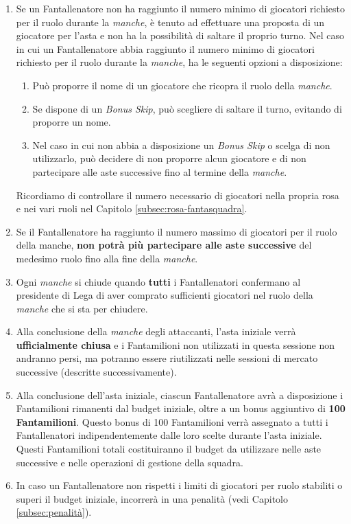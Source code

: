 \documentclass[12pt]{article}
\begin{document}
\begin{enumerate}
\item Se un Fantallenatore non ha raggiunto il numero minimo di giocatori richiesto per il ruolo durante la \textit{manche}, è tenuto ad effettuare una proposta di un giocatore per l'asta e non ha la possibilità di saltare il proprio turno.
Nel caso in cui un Fantallenatore abbia raggiunto il numero minimo di giocatori richiesto per il ruolo durante la \textit{manche}, ha le seguenti opzioni a disposizione:
\begin{enumerate}
    \item Può proporre il nome di un giocatore che ricopra il ruolo della \textit{manche}.
    \item Se dispone di un \textit{Bonus Skip}, può scegliere di saltare il turno, evitando di proporre un nome.
    \item Nel caso in cui non abbia a disposizione un \textit{Bonus Skip} o scelga di non utilizzarlo, può decidere di non proporre alcun giocatore e di non partecipare alle aste successive fino al termine della \textit{manche}.
\end{enumerate}
Ricordiamo di controllare il numero necessario di giocatori nella propria rosa e
nei vari ruoli nel Capitolo \ref{subsec:rosa-fantasquadra}.
\item Se il Fantallenatore ha raggiunto il numero massimo di giocatori per il ruolo della manche, \textbf{non potrà più partecipare alle aste successive} del medesimo ruolo fino alla fine della \textit{manche}.
\item Ogni \textit{manche} si chiude quando \textbf{tutti} i Fantallenatori confermano al presidente di Lega di aver comprato sufficienti giocatori nel ruolo della \textit{manche} che si sta per chiudere.
\item Alla conclusione della \textit{manche} degli attaccanti, l'asta iniziale verrà \textbf{ufficialmente chiusa} e i Fantamilioni non utilizzati in questa sessione non andranno persi, ma potranno essere riutilizzati nelle sessioni di mercato successive (descritte successivamente).
\item Alla conclusione dell'asta iniziale, ciascun Fantallenatore avrà a disposizione i Fantamilioni rimanenti dal budget iniziale, oltre a un bonus aggiuntivo di \textbf{100 Fantamilioni}. Questo bonus di 100 Fantamilioni verrà assegnato a tutti i Fantallenatori indipendentemente dalle loro scelte durante l'asta iniziale. Questi Fantamilioni totali costituiranno il budget da utilizzare nelle aste successive e nelle operazioni di gestione della squadra.
\item In caso un Fantallenatore non rispetti i limiti di giocatori per ruolo stabiliti o superi il budget iniziale, incorrerà in una penalità (vedi Capitolo \ref{subsec:penalità}).
\end{enumerate}
\end{document}
